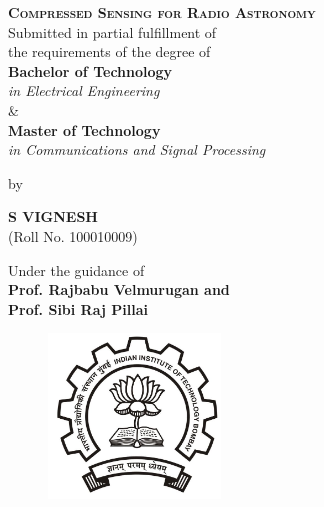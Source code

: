 \begin{titlepage}
    \begin{center}
	\textbf{%
	\vspace{0.05in}
	\Large{\textsc{Compressed Sensing for Radio Astronomy}}\\ \vspace{0.1in}
	}
	\vspace{0.5in}
	\large Submitted in partial fulfillment of\\
	the requirements of the degree of\\
	\vspace{0.3in}
	\textbf{Bachelor of Technology} \\ \emph{in Electrical Engineering} \\ \& \\ \textbf{Master of Technology} \\ \emph{in Communications and Signal Processing}\\ \vspace{0.05in}

	\vspace{0.30in}
	\large{by}\\
	\vspace{0.30in}

	\large{\textsc{\textbf{S VIGNESH}}}\\(Roll No. 100010009)

	\vspace{0.6in}
        \normalsize{Under the guidance of}\\ \vspace{0.1in}
	\textbf{\large{	Prof. Rajbabu Velmurugan and \\
	\vspace{0.1in}Prof. Sibi Raj Pillai 
}}\\
	\vspace{0.2in}

	\begin{figure}[h]
	\begin{center}
	\includegraphics[width=1.8in]{images/logo.jpg}
	\end{center}
	\end{figure}


\end{center}
\end{titlepage}
